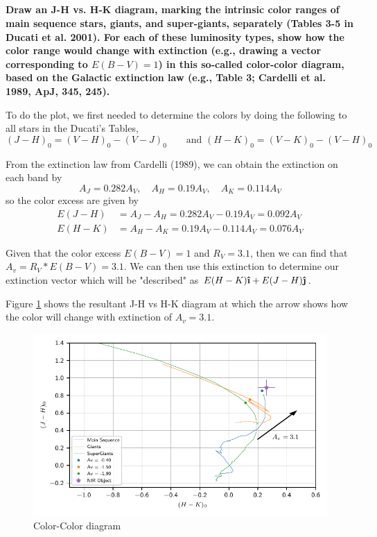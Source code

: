 \subsection{}
\textbf{Draw an J-H vs. H-K diagram, marking the intrinsic color ranges of main sequence stars, giants, and super-giants, separately (Tables 3-5 in Ducati et al. 2001).
For each of these luminosity types, show how the color range would change with extinction (e.g., drawing a vector corresponding to $E(B-V)=1$) in this so-called color-color diagram, based on the Galactic extinction law (e.g., Table 3; Cardelli et al. 1989, ApJ, 345, 245).}

To do the plot, we first needed to determine the colors by doing the following to all stars in the Ducati's Tables,
\begin{equation*}
    (J-H)_0 = (V-H)_0 - (V-J)_0\qquad\text{and }
    (H-K)_0 = (V-K)_0 - (V-H)_0
\end{equation*}

From the extinction law from Cardelli (1989), we can obtain the extinction on each band by
\begin{equation*}
    A_J = 0.282A_V,\quad A_H = 0.19A_V,\quad A_K = 0.114A_V
\end{equation*}
so the color excess are given by
\begin{align*}
    E(J-H) &= A_J - A_H = 0.282A_V - 0.19A_V = 0.092A_V\\
    E(H-K) &= A_H - A_K = 0.19A_V - 0.114A_V = 0.076A_V
\end{align*}

Given that the color excess $E(B-V)=1$ and $R_V=3.1$, then we can find that $A_v = R_V * E(B-V) = 3.1$. 
We can then use this extinction to determine our extinction vector which will be "described" as $E(H-K)\uveci + E(J-H)\uvecj$.

Figure \ref{fig:ColorColorDiagram} shows the resultant J-H vs H-K diagram at which the arrow shows how the color will change with extinction of $A_v=3.1$. 

\begin{figure}
    \centering
    \includegraphics{CodeAndFigures/ASTRO643_HW4P4plot.pdf}
    \caption{Color-Color diagram}
    \label{fig:ColorColorDiagram}
\end{figure}

